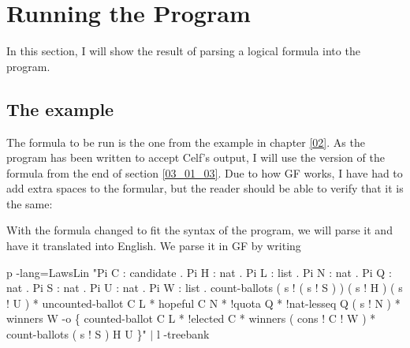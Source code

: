 \section{Running the Program}
\label{04_04}

In this section, I will show the result of parsing a logical formula into the program.

\subsection{The example}

The formula to be run is the one from the example in chapter \ref{02}. As the program has been written to accept Celf's output, I will use the version of the formula from the end of section \ref{03_01_03}. Due to how GF works, I have had to add extra spaces to the formular, but the reader should be able to verify that it is the same:

\begin{textoform}
\end{textoform}

With the formula changed to fit the syntax of the program, we will parse it and have it translated into English. We parse it in GF by writing
\begin{texto2}
p -lang=LawsLin "Pi C : candidate . Pi H : nat . Pi L : list . Pi N : nat . Pi Q : nat . Pi S : nat . Pi U : nat . Pi W : list . count-ballots ( s ! ( s ! S ) ) ( s ! H ) ( s ! U ) * uncounted-ballot C L * hopeful C N * !quota Q * !nat-lesseq Q ( s ! N ) * winners W -o \{ counted-ballot C L * !elected C * winners ( cons ! C ! W ) * count-ballots ( s ! S ) H U \}" $|$ l -treebank
\end{texto2}

